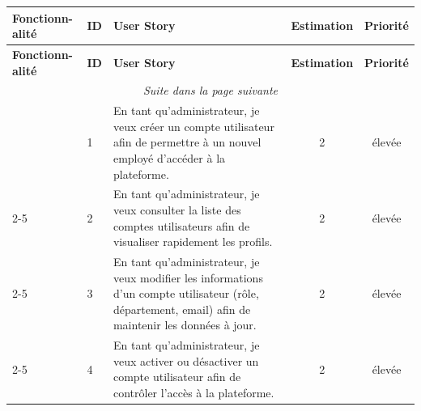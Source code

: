 \documentclass[12pt,a4paper]{report}
\begin{document}
\begin{longtable}{|p{2cm}|p{1cm}|p{8.3cm}|c|c|}

\hline

\textbf{Fonctionn-\newline}\textbf{alité} & \textbf{ID} & \textbf{\centering User Story} & \textbf{Estimation} & \textbf{Priorité} \\

\hline

\endfirsthead



\hline

\textbf{Fonctionn-\newline}\textbf{alité} & \textbf{ID} & \textbf{User Story} & \textbf{Estimation} & \textbf{Priorité} \\

\hline

\endhead



\hline

\multicolumn{5}{|c|}{\textit{Suite dans la page suivante}} \\

\hline

\endfoot



\hline

\endlastfoot



\multirow{10}{*}{Comptes} & 1 & En tant qu'administrateur, je veux créer un compte utilisateur afin de permettre à un nouvel employé d'accéder à la plateforme. & 2 & élevée \\

\cline{2-5}

& 2 & En tant qu'administrateur, je veux consulter la liste des comptes utilisateurs afin de visualiser rapidement les profils. & 2 & élevée \\

\cline{2-5}

& 3 & En tant qu'administrateur, je veux modifier les informations d’un compte utilisateur (rôle, département, email) afin de maintenir les données à jour. & 2 & élevée \\

\cline{2-5}

& 4 & En tant qu'administrateur, je veux activer ou désactiver un compte utilisateur afin de contrôler l’accès à la plateforme. & 2 & élevée \\


\end{longtable}
\end{document}
